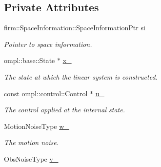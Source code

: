\subsection*{\-Private \-Attributes}
\begin{DoxyCompactItemize}
\item 
\hypertarget{class_linear_system_a4d5364a7af5e313c08c0f29cd520d6c2}{firm\-::\-Space\-Information\-::\-Space\-Information\-Ptr \hyperlink{class_linear_system_a4d5364a7af5e313c08c0f29cd520d6c2}{si\-\_\-}}\label{class_linear_system_a4d5364a7af5e313c08c0f29cd520d6c2}

\begin{DoxyCompactList}\small\item\em \-Pointer to space information. \end{DoxyCompactList}\item 
\hypertarget{class_linear_system_a0c0d8d1a986bd267171d8c821e173d1e}{ompl\-::base\-::\-State $\ast$ \hyperlink{class_linear_system_a0c0d8d1a986bd267171d8c821e173d1e}{x\-\_\-}}\label{class_linear_system_a0c0d8d1a986bd267171d8c821e173d1e}

\begin{DoxyCompactList}\small\item\em \-The state at which the linear system is constructed. \end{DoxyCompactList}\item 
\hypertarget{class_linear_system_a5b5cb60bca40f61e6b4a6ac3afe56115}{const ompl\-::control\-::\-Control $\ast$ \hyperlink{class_linear_system_a5b5cb60bca40f61e6b4a6ac3afe56115}{u\-\_\-}}\label{class_linear_system_a5b5cb60bca40f61e6b4a6ac3afe56115}

\begin{DoxyCompactList}\small\item\em \-The control applied at the internal state. \end{DoxyCompactList}\item 
\hypertarget{class_linear_system_ab3909105492e1b8f55919584d9f99a03}{\-Motion\-Noise\-Type \hyperlink{class_linear_system_ab3909105492e1b8f55919584d9f99a03}{w\-\_\-}}\label{class_linear_system_ab3909105492e1b8f55919584d9f99a03}

\begin{DoxyCompactList}\small\item\em \-The motion noise. \end{DoxyCompactList}\item 
\hypertarget{class_linear_system_a41f05f9ef0c2e5e69a0b0c2d50d983bb}{\-Obs\-Noise\-Type \hyperlink{class_linear_system_a41f05f9ef0c2e5e69a0b0c2d50d983bb}{v\-\_\-}}\label{class_linear_system_a41f05f9ef0c2e5e69a0b0c2d50d983bb}


\end{DoxyCompactItemize}
